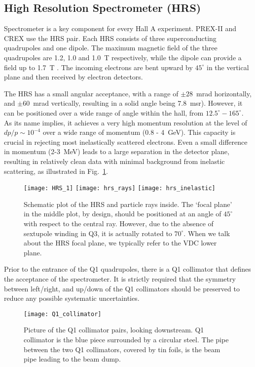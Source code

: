 \subsection{High Resolution Spectrometer (HRS)}
Spectrometer is a key component for every Hall A experiment. PREX-II and CREX
use the HRS pair. Each HRS consists of three superconducting
quadrupoles and one dipole. The maximum magnetic field of the three quadrupoles are
1.2, 1.0 and 1.0~T respectively, while the dipole can provide a field up to 1.7~T \cite{halla_manual}. 
The incoming electrons are bent upward by $45^\circ$ in the vertical plane and then
received by electron detectors.

The HRS has a small angular acceptance, with a range of $\pm 28$~mrad horizontally,
and $\pm 60$~mrad vertically, resulting in a 
solid angle being 7.8~msr). However, it can be positioned over a wide range of angle
within the hall, from $12.5^\circ - 165^\circ$. As its name implies, it achieves a 
very high momentum resolution at the level of $dp/p \sim 10^{-4}$ over a wide range of momentum 
(0.8 - 4~GeV). This capacity is crucial in rejecting most inelastically scattered electrons.
Even a small difference in momentum (2-3~MeV) leads to a
large separation in the detector plane, resulting in relatively clean data 
with minimal background from inelastic scattering, as illustrated in Fig.~\ref{fig:HRS}.

\begin{figure}[!h]
    \centering
    \texttt{[image: HRS\_1]}
    \texttt{[image: hrs\_rays]}
    \texttt{[image: hrs\_inelastic]}
    \caption[HRS]{Schematic plot of the HRS and particle rays inside. \cite{halla3d}
    The `focal plane' in the middle plot, by design, should be positioned at an angle of $45^\circ$
    with respect to the central ray. However, due to the absence of sextupole winding in Q3, 
    it is actually rotated to $70^\circ$. When we talk about the HRS focal plane, we
    typically refer to the VDC lower plane.
    }
    \label{fig:HRS}
\end{figure}


Prior to the entrance of the Q1 quadrupoles, there is a Q1 collimator that defines
the acceptance of the spectrometer. It is strictly required that the symmetry between
left/right, and up/down of the Q1 collimators should be preserved to reduce any
possible systematic uncertainties.
\begin{figure}[!h]
    \centering
    \texttt{[image: Q1\_collimator]}
    \caption[Q1 Collimator pairs]{Picture of the Q1 collimator pairs, looking downstream. 
    Q1 collimator is the blue piece surrounded by a circular steel.
    The pipe between the two Q1 collimators, covered by tin foils, is the
    beam pipe leading to the beam dump.
    }
\end{figure}
